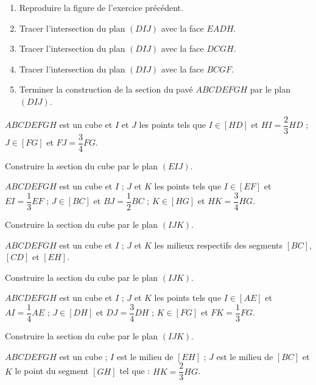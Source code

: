 \documentclass{cornouaille}
\begin{document}
\begin{colonne*exercice}
\begin{exercice}
  \begin{enumerate}
  \item Reproduire la figure de l'exercice précédent.
  \item Tracer l'intersection du plan $(DIJ)$ avec la face $EADH$.
  \item Tracer l'intersection du plan $(DIJ)$ avec la face $DCGH$.
  \item Tracer l'intersection du plan $(DIJ)$ avec la face $BCGF$.
  \item Terminer la construction de la section du pavé $ABCDEFGH$ par
    le plan $(DIJ)$.
  \end{enumerate}
\end{exercice}

\begin{exercice}
  $ABCDEFGH$ est un cube et $I$ et $J$ les points tels que $I\in [HD]$
  et $HI=\dfrac{2}{3}HD$ ; $J\in [FG]$ et $FJ=\dfrac{3}{4}FG$.

  Construire la section du cube par le plan $(EIJ)$.
\end{exercice}

\begin{exercice}
  $ABCDEFGH$ est un cube et $I$ ; $J$ et $K$ les points tels que
  $I\in [EF]$ et $EI=\dfrac{1}{3}EF$ ; $J\in [BC]$ et
  $BJ=\dfrac{1}{2}BC$ ; $K\in [HG]$ et $HK=\dfrac{3}{4}HG$.

  Construire la section du cube par le plan $(IJK)$.
\end{exercice}

\begin{exercice}
  $ABCDEFGH$ est un cube et $I$ ; $J$ et $K$ les milieux respectifs
  des segments $[BC]$, $[CD]$ et $[EH]$.

  Construire la section du cube par le plan $(IJK)$.
\end{exercice}

\begin{exercice}
  $ABCDEFGH$ est un cube et $I$ ; $J$ et $K$ les points tels que
  $I\in [AE]$ et $AI=\dfrac{1}{4}AE$ ; $J\in [DH]$ et
  $DJ=\dfrac{3}{4}DH$ ; $K\in [FG]$ et $FK=\dfrac{1}{3}FG$.

  Construire la section du cube par le plan $(IJK)$.
\end{exercice}



\begin{exercice}
  $ABCDEFGH$ est un cube ; $I$ est le milieu de $[EH]$ ; $J$ est le
  milieu de $[BC]$ et $K$ le point du segment $[GH]$ tel que :
  $HK=\dfrac{2}{3}HG$.


\end{exercice}
\end{colonne*exercice}
\end{document}
